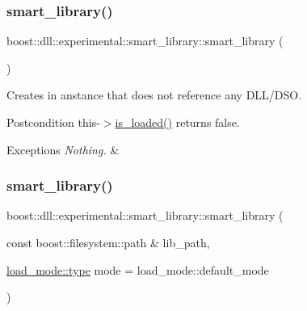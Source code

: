 \subsubsection{\texorpdfstring{smart\+\_\+library()}{smart\_library()}\hspace{0.1cm}{\footnotesize\ttfamily [1/8]}}
{\footnotesize\ttfamily boost\+::dll\+::experimental\+::smart\+\_\+library\+::smart\+\_\+library (\begin{DoxyParamCaption}{ }\end{DoxyParamCaption})\hspace{0.3cm}{\ttfamily [inline]}}





Creates in anstance that does not reference any D\+L\+L/\+D\+SO.

\begin{DoxyPostcond}{Postcondition}
this-\/$>$\hyperlink{a01712_abe903598b2f65c04360d58943cc08255}{is\+\_\+loaded()} returns false. 
\end{DoxyPostcond}

\begin{DoxyExceptions}{Exceptions}
{\em Nothing.} & \\
\hline
\end{DoxyExceptions}
\mbox{\label{a01712_af88521398a2110952dd5d0820b3b4deb}} 
\subsubsection{\texorpdfstring{smart\+\_\+library()}{smart\_library()}\hspace{0.1cm}{\footnotesize\ttfamily [2/8]}}
{\footnotesize\ttfamily boost\+::dll\+::experimental\+::smart\+\_\+library\+::smart\+\_\+library (\begin{DoxyParamCaption}\item[{const boost\+::filesystem\+::path \&}]{lib\+\_\+path,  }\item[{\hyperlink{a00272_a1918a602801479bc0bade54ff5665129}{load\+\_\+mode\+::type}}]{mode = {\ttfamily load\+\_\+mode\+:\+:default\+\_\+mode} }\end{DoxyParamCaption})\hspace{0.3cm}{\ttfamily [inline]}}





